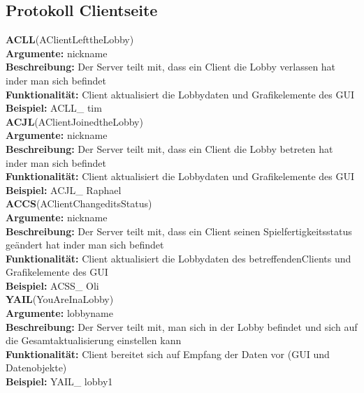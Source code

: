 \documentclass[a4paper, 12pt, oneside, headsepline=.5pt,footsepline=.5pt]{scrartcl}
\begin{document}
\subsection{Protokoll Clientseite}
{\large \textbf{ACLL}(AClientLefttheLobby)} \\
\hspace{4ex} \textbf{Argumente:} {nickname} \\
\hspace{4ex} \textbf{Beschreibung:} {Der Server teilt mit, dass ein Client die Lobby verlassen hat inder man sich befindet} \\
\hspace{4ex} \textbf{Funktionalität:} {Client aktualisiert die Lobbydaten und Grafikelemente des GUI} \\
\hspace{4ex} \textbf{Beispiel:} {ACLL\_ tim} \\

{\large \textbf{ACJL}(AClientJoinedtheLobby)} \\
\hspace{4ex} \textbf{Argumente:} {nickname} \\
\hspace{4ex} \textbf{Beschreibung:} {Der Server teilt mit, dass ein Client die Lobby betreten hat inder man sich befindet} \\
\hspace{4ex} \textbf{Funktionalität:} {Client aktualisiert die Lobbydaten und Grafikelemente des GUI} \\
\hspace{4ex} \textbf{Beispiel:} {ACJL\_ Raphael} \\

{\large \textbf{ACCS}(AClientChangeditsStatus)} \\
\hspace{4ex} \textbf{Argumente:} {nickname} \\
\hspace{4ex} \textbf{Beschreibung:} {Der Server teilt mit, dass ein Client seinen Spielfertigkeitsstatus geändert hat inder man sich befindet} \\
\hspace{4ex} \textbf{Funktionalität:} {Client aktualisiert die Lobbydaten des betreffendenClients und Grafikelemente des GUI} \\
\hspace{4ex} \textbf{Beispiel:} {ACSS\_ Oli} \\

{\large \textbf{YAIL}(YouAreInaLobby)} \\
\hspace{4ex} \textbf{Argumente:} {lobbyname} \\
\hspace{4ex} \textbf{Beschreibung:} {Der Server teilt mit, man sich in der Lobby befindet und sich auf die Gesamtaktualisierung einstellen kann} \\
\hspace{4ex} \textbf{Funktionalität:} {Client bereitet sich auf Empfang der Daten vor (GUI und Datenobjekte)} \\
\hspace{4ex} \textbf{Beispiel:} {YAIL\_ lobby1} \\
\end{document}
